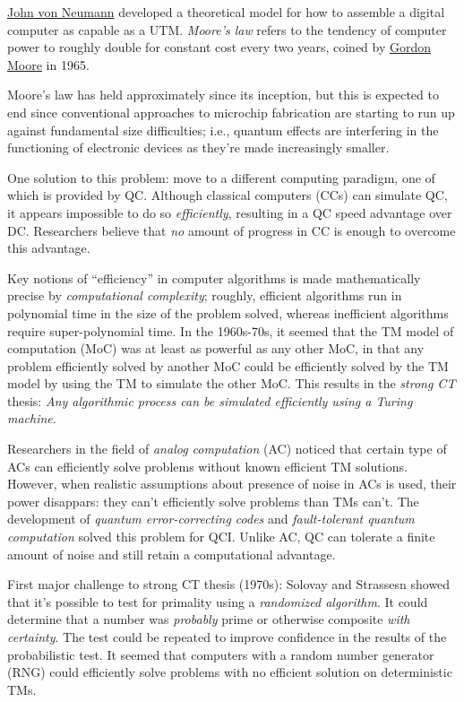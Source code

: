 \documentclass{article}
\begin{document}
\href{https://en.wikipedia.org/wiki/John_von_Neumann}{John von Neumann} developed a theoretical model for how to assemble a digital computer as capable as a UTM. \textit{Moore's law} refers to the tendency of computer power to roughly double for constant cost every two years, coined by \href{https://en.wikipedia.org/wiki/Gordon_Moore}{Gordon Moore} in 1965.

Moore's law has held approximately since its inception, but this is expected to end since conventional approaches to microchip fabrication are starting to run up against fundamental size difficulties; i.e., quantum effects are interfering in the functioning of electronic devices as they're made increasingly smaller.

One solution to this problem: move to a different computing paradigm, one of which is provided by QC. Although classical computers (CCs) can simulate QC, it appears impossible to do so \textit{efficiently}, resulting in a QC speed advantage over DC. Researchers believe that \textit{no} amount of progress in CC is enough to overcome this advantage.

Key notions of ``efficiency'' in computer algorithms is made mathematically precise by \textit{computational complexity}; roughly, efficient algorithms run in polynomial time in the size of the problem solved, whereas inefficient algorithms require super-polynomial time. In the 1960s-70s, it seemed that the TM model of computation (MoC) was at least as powerful as any other MoC, in that any problem efficiently solved by another MoC could be efficiently solved by the TM model by using the TM to simulate the other MoC. This results in the \textit{strong CT} thesis: \textit{Any algorithmic process can be simulated efficiently using a Turing machine}.

Researchers in the field of \textit{analog computation} (AC) noticed that certain type of ACs can efficiently solve problems without known efficient TM solutions. However, when realistic assumptions about presence of noise in ACs is used, their power disappars: they can't efficiently solve problems than TMs can't. The development of \textit{quantum error-correcting codes} and \textit{fault-tolerant quantum computation} solved this problem for QCI. Unlike AC, QC can tolerate a finite amount of noise and still retain a computational advantage.

First major challenge to strong CT thesis (1970s): Solovay and Strassesn showed that it's possible to test for primality using a \textit{randomized algorithm}. It could determine that a number was \textit{probably} prime or otherwise composite \textit{with certainty}. The test could be repeated to improve confidence in the results of the probabilistic test. It seemed that computers with a random number generator (RNG) could efficiently solve problems with no efficient solution on deterministic TMs.
\end{document}
